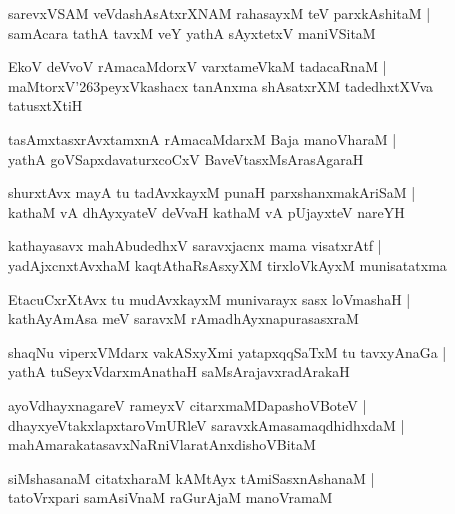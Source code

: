 \documentclass[twoside,12pt,openright]{book}
\def\S{\char'263}
\newcounter{shloka}[chapter]
\begin{document}
\begin{shloka}%
sarevxVSAM veVdashAsAtxrXNAM rahasayxM teV parxkAshitaM |\\
samAcara tathA tavxM veY yathA sAyxtetxV maniVSitaM 
\end{shloka}

\begin{shloka}%
EkoV deVvoV rAmacaMdorxV varxtameVkaM tadacaRnaM |\\
maMtorxV\S peyxVkashacx tanAnxma shAsatxrXM tadedhxtXVva tatusxtXtiH
\end{shloka}

\begin{shloka}%
tasAmxtasxrAvxtamxnA rAmacaMdarxM Baja manoVharaM |\\
yathA goVSapxdavaturxcoCxV BaveVtasxMsArasAgaraH 
\end{shloka}

\begin{shloka}%
shurxtAvx mayA tu tadAvxkayxM punaH parxshanxmakAriSaM |\\
kathaM vA dhAyxyateV deVvaH kathaM vA pUjayxteV nareYH
\end{shloka}

\begin{shloka}%
kathayasavx mahAbudedhxV saravxjacnx mama visatxrAtf |\\
yadAjxcnxtAvxhaM kaqtAthaRsAsxyXM tirxloVkAyxM munisatatxma
\end{shloka}

\begin{shloka}%
EtacuCxrXtAvx tu mudAvxkayxM munivarayx sasx loVmashaH |\\
kathAyAmAsa meV saravxM rAmadhAyxnapurasasxraM 
\end{shloka}

\begin{shloka}%
shaqNu viperxVMdarx vakASxyXmi yatapxqqSaTxM tu tavxyAnaGa |\\
yathA tuSeyxVdarxmAnathaH saMsArajavxradArakaH 
\end{shloka}

\begin{shloka}%
ayoVdhayxnagareV rameyxV citarxmaMDapashoVBoteV |\\
dhayxyeVtakxlapxtaroVmURleV saravxkAmasamaqdhidhxdaM |\\
mahAmarakatasavxNaRniVlaratAnxdishoVBitaM 
\end{shloka}

\begin{shloka}%
siMshasanaM citatxharaM kAMtAyx tAmiSasxnAshanaM |\\
tatoVrxpari samAsiVnaM raGurAjaM manoVramaM 
\end{shloka}
\end{document}
